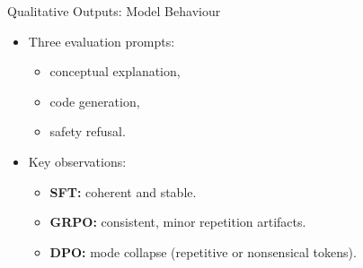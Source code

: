 \documentclass[10pt]{beamer}
\begin{document}
\begin{frame}{Qualitative Outputs: Model Behaviour}
\large

\begin{itemize}
    \item Three evaluation prompts:
    \begin{itemize}
        \item conceptual explanation,
        \item code generation,
        \item safety refusal.
    \end{itemize}

    \vspace{0.3cm}

    \item Key observations:
    \begin{itemize}
        \item \textbf{SFT:} coherent and stable.
        \item \textbf{GRPO:} consistent, minor repetition artifacts.
        \item \textbf{DPO:} mode collapse (repetitive or nonsensical tokens).
    \end{itemize}
\end{itemize}

\vspace{0.4cm}


\end{frame}
\end{document}
